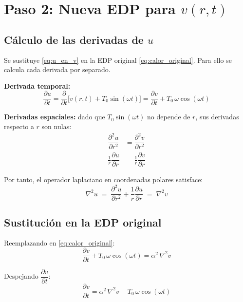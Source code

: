 \documentclass[12pt, a4paper]{article}
\newcommand{\pd}[2]{\dfrac{\partial #1}{\partial #2}}
\newcommand{\pdd}[2]{\dfrac{\partial^2 #1}{\partial #2^2}}
\begin{document}
\section{Paso 2: Nueva EDP para \texorpdfstring{$v(r,t)$}{v(r,t)}}

\subsection{Cálculo de las derivadas de \texorpdfstring{$u$}{u}}

Se sustituye \eqref{eq:u_en_v} en la EDP original \eqref{eq:calor_original}. Para ello
se calcula cada derivada por separado.

\medskip
\noindent\textbf{Derivada temporal:}
\begin{equation}
  \pd{u}{t} = \pd{}{t}\bigl[v(r,t) + T_0\sin(\omega t)\bigr]
            = \pd{v}{t} + T_0\,\omega\cos(\omega t)
\end{equation}

\noindent\textbf{Derivadas espaciales:} dado que $T_0\sin(\omega t)$ no depende de $r$,
sus derivadas respecto a $r$ son nulas:
\begin{align}
  \pdd{u}{r} &= \pdd{v}{r} \\[4pt]
  \frac{1}{r}\pd{u}{r} &= \frac{1}{r}\pd{v}{r}
\end{align}

Por tanto, el operador laplaciano en coordenadas polares satisface:
\begin{equation}
  \nabla^2 u \;=\; \pdd{u}{r} + \frac{1}{r}\pd{u}{r} \;=\; \nabla^2 v
\end{equation}

\subsection{Sustitución en la EDP original}

Reemplazando en \eqref{eq:calor_original}:
\begin{equation}
  \pd{v}{t} + T_0\,\omega\cos(\omega t) = \alpha^2\,\nabla^2 v
\end{equation}

Despejando $\pd{v}{t}$:
\begin{equation}
  \pd{v}{t} = \alpha^2\,\nabla^2 v - T_0\,\omega\cos(\omega t)
\end{equation}
\end{document}
